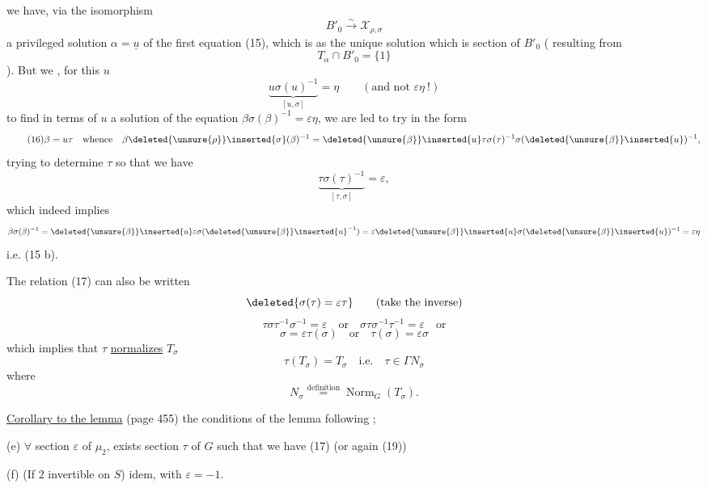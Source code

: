  we have, via the isomorphism
\[
B'_0\xrightarrow{\sim}\mathcal X_{\rho,\sigma}
\]
a privileged solution $\alpha=\underline u$ of the first equation (15), which is
 as the unique solution which is  section of
$B'_0$ ( resulting from
\[
T_\alpha\cap B'_0=\{1\}
\]
).
But we , for this $u$
\[
\underbrace{u\sigma(u)^{-1}}_{[u,\sigma]}=\eta
\qquad(\text{and not }\varepsilon\eta\ !)
\]
to find in terms of $u$ a solution of the equation
 $\beta\sigma(\beta)^{-1}=\varepsilon\eta$, we are led to try in the form
\[
\tag{16}
\beta=u\tau\quad\text{whence}\quad
\beta\deleted{\unsure{\rho}}\inserted{\sigma}(\beta)^{-1}
=\deleted{\unsure{\beta}}\inserted{u}\tau\sigma(\tau)^{-1}
\sigma(\deleted{\unsure{\beta}}\inserted{u})^{-1},
\]
trying to determine $\tau$ so that we have
\[
\tag{17}
\underbrace{\tau\sigma(\tau)^{-1}}_{[\tau,\sigma]}=\varepsilon,
\]
which indeed implies
\[
\beta\sigma(\beta)^{-1}
=\deleted{\unsure{\beta}}\inserted{u}\varepsilon\sigma(\deleted{\unsure{\beta}}\inserted{u}^{-1})
=\varepsilon\deleted{\unsure{\beta}}\inserted{u}\sigma(\deleted{\unsure{\beta}}\inserted{u})^{-1}
=\varepsilon\eta
\]
i.e. (15 b). 

The relation (17) can also be written
\[
\deleted{\sigma(\tau)=\varepsilon\tau}
\qquad(\text{take the inverse})
\]
\[
\tag{18}
\tau\sigma\tau^{-1}\sigma^{-1}=\varepsilon
\quad\text{or}\quad
\sigma\tau\sigma^{-1}\tau^{-1}=\varepsilon
\quad\text{or}
\]
\[
\tag{19}
\sigma=\varepsilon\tau(\sigma)
\quad\text{or}\quad
\tau(\sigma)=\varepsilon\sigma
\]
which implies that $\tau$ \uline{normalizes} $T_\sigma$
\[
\tag{20}
\tau(T_\sigma)=T_\sigma\quad\text{i.e.}\quad\tau\in\Gamma N_\sigma
\]
where
\[
\tag{21}
N_\sigma\overset{\text{definition}}{=}\operatorname{Norm}_G(T_\sigma).
\]

\uline{Corollary to the lemma} (page 455) the  conditions of the lemma
 
  following ;

(e) $\forall$  section
$\varepsilon$ of $\mu_2$, exists 
section  $\tau$ of $G$ such that we have (17) (or again (19))

(f) (If $2$ invertible on $S$) idem, with $\varepsilon=-1$.

